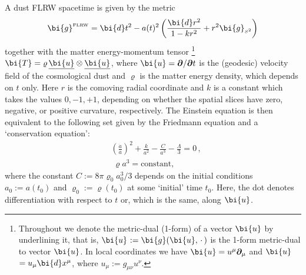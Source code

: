\documentclass
[rmp,aps,twocolumn,showpacs,preprintnumbers,amsmath,amssymb]{revtex4}
\theoremstyle{plain}
\theoremstyle{definition}
\theoremstyle{remark}
\newcommand{\ul}[1]{\underline{#1}}
\newcommand{\sss}{\scriptscriptstyle}
\newcommand{\ind}[1]{{\sss \text{#1}}}        %
\newcommand{\bpartial}{\boldsymbol{\partial}} %
\newcommand{\ed}{\bi{d}}                      %
\newcommand{\Stwo}{{S^2}}                         %
\newcommand{\sStwo}{{\sss \Stwo}}                 %
\newcommand{\gStwo}{\g_\sStwo}                    %
\newcommand{\g}{\bg}                            %
\newcommand{\bg}{\bi{g}}
\newcommand{\bu}{\bi{u}}
\newcommand{\bT}{\bi{T}}
\begin{document}
A dust FLRW spacetime is given by the metric 
%
\begin{equation}\label{eq:FLRW-metric}
  \g^\ind{FLRW} = \ed t^2 
  -a(t)^{2}\left( \frac{\ed r^2}{1-kr^2} + r^2\gStwo \right) 
\end{equation}
%
together with the matter energy-momentum tensor%
\footnote{Throughout we denote the metric-dual (1-form) of a vector 
$\bu$ by underlining it, that is, \ul{$\bu$}\,$:=\bg(\bu,\,\cdot\,)$ is 
the 1-form metric-dual to vector $\bu$. In local coordinates we have 
$\bu=u^\mu\bpartial_\mu$ and \ul{$\bu$}\,$=u_\mu \ed x^\mu$, where 
$u_\mu:=g_{\mu\nu}u^\nu$.}
$\bT=\varrho\,\ul\bu\otimes\ul\bu$, where $\bu=\bpartial/\bpartial t$ 
is the (geodesic) velocity field of the cosmological dust and $\varrho$ 
is the matter energy density, which depends on $t$ only. Here $r$ 
is the comoving radial coordinate and $k$ is a constant which takes 
the values $0,-1,+1$, depending on whether the spatial slices have 
zero, negative, or positive curvature, respectively. The Einstein 
equation is then equivalent to the following set given by the 
Friedmann equation and a `conservation equation':
%
\begin{subequations}%
\begin{align}
  \label{eq:dust-FLRW-Friedmann}
  &\left( \frac{\dot a}{a} \right)^2 + \frac{k}{a^2} 
   - \frac{C}{a^3} - \frac{\Lambda}{3} = 0 \,, \\
  \label{eq:dust-FLRW-cons-eq}
  &\;\varrho a^3 = \text{constant},
\end{align}
\end{subequations}
%
where the constant $C:=8\pi\varrho_\ind{0}a^3_\ind{0}/3$ depends on the 
initial conditions $a_\ind{0}:=a(t_\ind{0})$ and 
$\varrho_\ind{0}:=\varrho(t_\ind{0})$ at some `initial' time $t_\ind{0}$.
Here, the dot denotes differentiation with respect to $t$ or, which is the 
same, along $\bu$. 
\end{document}
